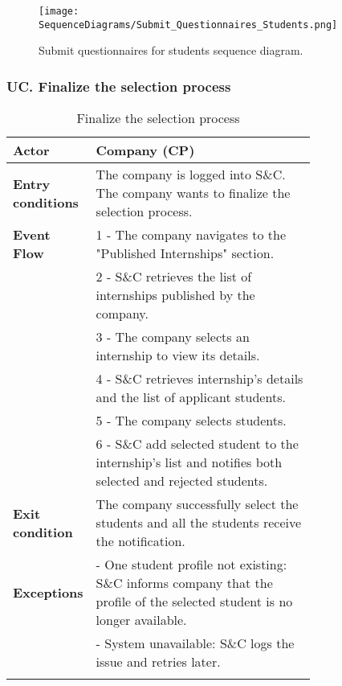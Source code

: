 \begin{figure}[H]
    \begin{center}
        \texttt{[image: SequenceDiagrams/Submit\_Questionnaires\_Students.png]}
        \caption{Submit questionnaires for students sequence diagram.}
        \label{fig:submit_questionnaires_for_students_seqd}%
    \end{center}
\end{figure}

\subsubsection*{UC\cuc . Finalize the selection process}
\begin{center}
    \begin{longtable}{|l|p{0.75\linewidth}|}
        \hline
        \textbf{Actor}            & Company (CP)\\
        \hline
        \textbf{Entry conditions} & The company is logged into S\&C. The company wants to finalize the selection process.\\
        \hline
        \textbf{Event Flow}    & 1 - The company navigates to the "Published                                                        Internships" section. \\
                                & 2 - S\&C retrieves the list of internships published by the company. \\
                                & 3 - The company selects an internship to view its details. \\
                                & 4 - S\&C retrieves internship's details and the list of applicant students.\\
                                & 5 - The company selects students.\\
                                & 6 - S\&C add selected student to the internship’s list and notifies both selected and rejected students.\\
        \hline
        \textbf{Exit condition}     & The company successfully select the students and all the students receive the notification.\\       
        \hline
        \textbf{Exceptions}     & - One student profile not existing: S\&C informs company that the profile of the selected student is no longer available.\\
                                & - System unavailable: S\&C logs the issue and retries later. \\
        \hline
        \caption{Finalize the selection process}
        \label{tab: finalize_the_selection_process_usecase}
    \end{longtable}
\end{center}

